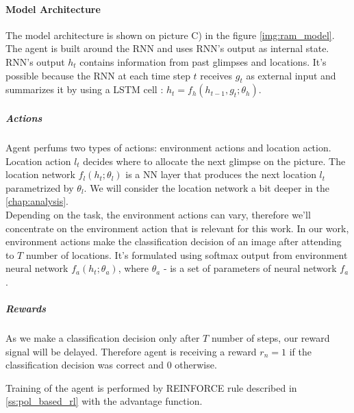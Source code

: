 \paragraph{Model Architecture} The model architecture is shown
on picture C) in the figure \ref{img:ram_model}. The agent is built around
the RNN and uses RNN's output as internal state. RNN's output $h_t$ contains
information from past glimpses and locations. It's possible
because the RNN at each time step $t$ receives $g_t$ as external input and
summarizes it by using a LSTM cell : $h_t = f_h(h_{t-1}, g_t; \theta_h)$.

\subparagraph{Actions} Agent perfums two types of actions: environment actions
and location action. Location action $l_t$ decides where to allocate the next glimpse
on the picture. The location network $f_l(h_t; \theta_l)$ is a NN layer
that produces the next location $l_t$ parametrized by $\theta_l$. We will consider the
location network a bit deeper in the \autoref{chap:analysis}. \\
Depending on the task, the environment actions can vary, therefore
we'll concentrate on the environment action that is relevant for this work.
In our work, environment actions make the classification decision of an image
after attending to $T$ number of locations.
It's formulated using softmax output from environment neural network
 $f_a(h_t; \theta_a)$, where $\theta_a$ - is a set of parameters of neural network $f_a$.

\subparagraph{Rewards} As we make a classification decision only after $T$
number of steps, our reward signal will be delayed. Therefore agent is receiving
a reward $r_n = 1$ if the classification decision was correct and $0$ otherwise.


Training of the agent is performed by REINFORCE rule
described in \autoref{ss:pol_based_rl} with the advantage function.










